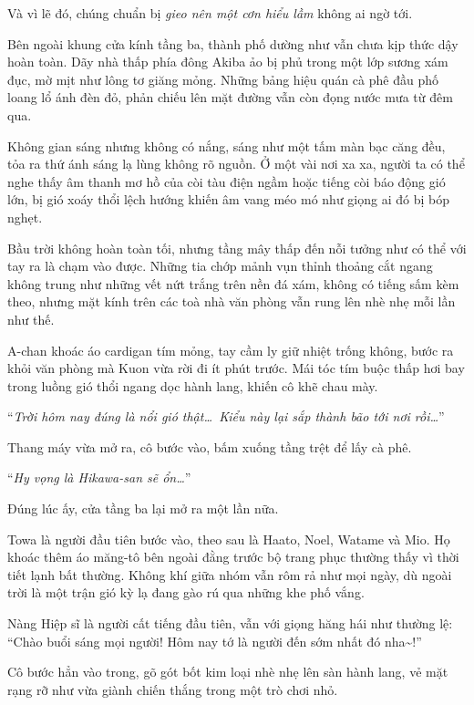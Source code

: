 \documentclass[../main.tex]{subfiles}
\begin{document}
Và vì lẽ đó, chúng chuẩn bị \emph{gieo nên một cơn hiểu lầm} không ai ngờ tới.

\ct

Bên ngoài khung cửa kính tầng ba, thành phố dường như vẫn chưa kịp thức dậy hoàn toàn. Dãy nhà thấp phía đông Akiba ảo bị phủ trong một lớp sương xám đục, mờ mịt như lông tơ giăng mỏng. Những bảng hiệu quán cà phê đầu phố loang lổ ánh đèn đỏ, phản chiếu lên mặt đường vẫn còn đọng nước mưa từ đêm qua.

Không gian sáng nhưng không có nắng, sáng như một tấm màn bạc căng đều, tỏa ra thứ ánh sáng lạ lùng không rõ nguồn. Ở một vài nơi xa xa, người ta có thể nghe thấy âm thanh mơ hồ của còi tàu điện ngầm hoặc tiếng còi báo động gió lớn, bị gió xoáy thổi lệch hướng khiến âm vang méo mó như giọng ai đó bị bóp nghẹt.

Bầu trời không hoàn toàn tối, nhưng tầng mây thấp đến nỗi tưởng như có thể với tay ra là chạm vào được. Những tia chớp mảnh vụn thỉnh thoảng cắt ngang không trung như những vết nứt trắng trên nền đá xám, không có tiếng sấm kèm theo, nhưng mặt kính trên các toà nhà văn phòng vẫn rung lên nhè nhẹ mỗi lần như thế.

A-chan khoác áo cardigan tím mỏng, tay cầm ly giữ nhiệt trống không, bước ra khỏi văn phòng mà Kuon vừa rời đi ít phút trước. Mái tóc tím buộc thấp hơi bay trong luồng gió thổi ngang dọc hành lang, khiến cô khẽ chau mày.

``\textit{Trời hôm nay đúng là nổi gió thật\dots\ Kiểu này lại sắp thành bão tới nơi rồi\dots}''

Thang máy vừa mở ra, cô bước vào, bấm xuống tầng trệt để lấy cà phê.

``\textit{Hy vọng là Hikawa-san sẽ ổn\dots}''

Đúng lúc ấy, cửa tầng ba lại mở ra một lần nữa.

Towa là người đầu tiên bước vào, theo sau là Haato, Noel, Watame và Mio. Họ khoác thêm áo măng-tô bên ngoài đằng trước bộ trang phục thường thấy vì thời tiết lạnh bất thường. Không khí giữa nhóm vẫn rôm rả như mọi ngày, dù ngoài trời là một trận gió kỳ lạ đang gào rú qua những khe phố vắng.

Nàng Hiệp sĩ là người cất tiếng đầu tiên, vẫn với giọng hăng hái như thường lệ: ``Chào buổi sáng mọi người! Hôm nay tớ là người đến sớm nhất đó nha\~{}!''

Cô bước hẳn vào trong, gõ gót bốt kim loại nhè nhẹ lên sàn hành lang, vẻ mặt rạng rỡ như vừa giành chiến thắng trong một trò chơi nhỏ.
\end{document}
